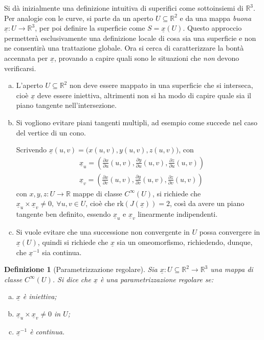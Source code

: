 \documentclass[12pt]{article}
\theoremstyle{style}
\newtheorem{definizione}{Definizione}[section]
\numberwithin{equation}{subsection}
\begin{document}
Si d\`a inizialmente una definizione intuitiva di superifici come sottoinsiemi di $\mathbb{R}^3$.
Per analogie con le curve, si parte da un aperto $U \subseteq \mathbb{R}^2$ e da una mappa \textit{buona} $\underline{x}:U\to \mathbb{R}^3$, per poi definire la superficie come $S = \underline{x}(U)$.
Questo approccio permetter\`a esclusivamente una definizione locale di cosa sia una superficie e non ne consentir\`a una trattazione globale.
Ora si cerca di caratterizzare la bont\`a accennata per $\underline{x}$, provando a capire quali sono le situazioni che \textit{non} devono verificarsi.
\begin{enumerate}[(a).]
	\item L'aperto $U\subseteq \mathbb{R}^2$ non deve essere mappato in una superficie che si interseca, cio\`e $\underline{x}$ deve essere iniettiva, altrimenti non si ha modo di capire quale sia il piano tangente nell'intersezione.
	\item Si vogliono evitare piani tangenti multipli, ad esempio come succede nel caso del vertice di un cono.
		
		Scrivendo $\underline{x}(u,v) = \big(x(u,v),y(u,v),z(u,v)\big)$, con
		\[
		\begin{split}
			&\underline{x}_u = \left(\frac{\partial x}{\partial u} (u,v), \frac{\partial y}{\partial u} (u,v), \frac{\partial z}{\partial u} (u,v)\right) \\
			&\underline{x}_v = \left(\frac{\partial x}{\partial v} (u,v), \frac{\partial y}{\partial v} (u,v), \frac{\partial z}{\partial v} (u,v)\right)
		\end{split}
		\] 
		con $x,y,z : U \to \mathbb{R}$ mappe di classe $C^\infty(U)$, si richiede che $\underline{x}_u \times \underline{x}_v \neq 0, \ \forall u,v \in U$, cio\`e che $\mathrm{rk} (J(\underline{x})) = 2$, cos\`i da avere un piano tangente ben definito, essendo $\underline{x}_u$ e $\underline{x}_v$ linearmente indipendenti.
	\item Si vuole evitare che una successione non convergente in $U$ possa convergere in $\underline{x}(U)$, quindi si richiede che $\underline{x}$ sia un omeomorfismo, richiedendo, dunque, che $\underline{x}^{-1}$ sia continua.
\end{enumerate}
\begin{definizione}
	[Parametrizzazione regolare]
	Sia $\underline{x}:U\subseteq \mathbb{R}^2 \to \mathbb{R}^3$ una mappa di classe $C^\infty(U)$.
	Si dice che $\underline{x}$ \`e una \textit{parametrizzazione regolare} se:
	\begin{enumerate}[(a).]
		\item $\underline{x}$ \`e iniettiva;
		\item $\underline{x}_u \times \underline{x}_v \neq 0$ in $U$;
		\item $\underline{x}^{-1}$ \`e continua.
	\end{enumerate}
\end{definizione}
\end{document}
